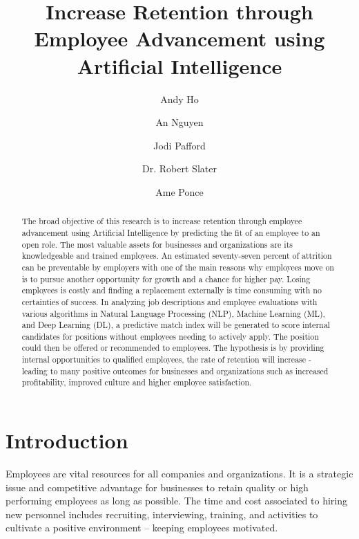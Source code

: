 \documentclass{llncs}
\title{Increase Retention through Employee Advancement using Artificial Intelligence}
\author{
Andy Ho\inst{1} \and
An Nguyen\inst{1} \and
Jodi Pafford\inst{1} \and
Dr. Robert Slater\inst{1}\and
Ame Ponce\inst{2}
}
\institute{
Master of Science in Data Science, Southern Methodist University,
Dallas TX 75275 USA 
\email{\{atho,angyuen2, jpafford, rslater\}@smu.edu} \and
Ernst \& Young, San Fransisco, California
\email{XXXXX@XXXXX.com} \\
}
\begin{document}
\maketitle              %

\setcounter{footnote}{0}
\begin{abstract}
The broad objective of this research is to increase retention through employee advancement using Artificial Intelligence by predicting the fit of an employee to an open role. The most valuable assets for businesses and organizations are its knowledgeable and trained employees. An estimated seventy-seven percent of attrition can be preventable by employers with one of the main reasons why employees move on is to pursue another opportunity for growth and a chance for higher pay. Losing employees is costly and finding a replacement externally is time consuming with no certainties of success. In analyzing job descriptions and employee evaluations with various algorithms in Natural Language Processing (NLP), Machine Learning (ML), and Deep Learning (DL), a predictive match index will be generated to score internal candidates for positions without employees needing to actively apply. The position could then be offered or recommended to employees. The hypothesis is by providing internal opportunities to qualified employees, the rate of retention will increase - leading to many positive outcomes for businesses and organizations such as increased profitability, improved culture and higher employee satisfaction.

\end{abstract}

\section{Introduction}

Employees are vital resources for all companies and organizations.  It is a strategic issue and competitive advantage for businesses to retain quality or high performing employees as long as possible.  The time and cost associated to hiring new personnel includes recruiting, interviewing, training, and activities to cultivate a positive environment – keeping employees motivated.
\end{document}
